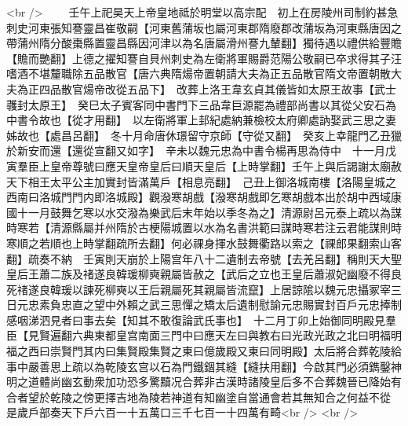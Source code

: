 <br />
　　壬午上祀昊天上帝皇地祗於明堂以高宗配　初上在房陵州司制約甚急刺史河東張知謇靈昌崔敬嗣【河東舊蒲坂也屬河東郡隋廢郡改蒲坂為河東縣唐因之帶蒲州隋分酸棗縣置靈昌縣因河津以為名唐屬滑州謇九輦翻】獨待遇以禮供給豐贍【贍而艷翻】上德之擢知謇自貝州刺史為左衛將軍賜爵范陽公敬嗣已卒求得其子汪嗜酒不堪釐職除五品散官【唐六典隋煬帝置朝請大夫為正五品散官隋文帝置朝散大夫為正四品散官煬帝改從五品下】　改葬上洛王韋玄貞其儀皆如太原王故事【武士彠封太原王】　癸巳太子賓客同中書門下三品韋巨源罷為禮部尚書以其從父安石為中書令故也【從才用翻】　以左衛將軍上邽紀處納兼檢校太府卿處訥娶武三思之妻姊故也【處昌呂翻】　冬十月命唐休璟留守京師【守從又翻】　癸亥上幸龍門乙丑獵於新安而還【還從宣翻又如字】　辛未以魏元忠為中書令楊再思為侍中　十一月戊寅羣臣上皇帝尊號曰應天皇帝皇后曰順天皇后【上時掌翻】壬午上與后謁謝太廟赦天下相王太平公主加實封皆滿萬戶【相息亮翻】　己丑上御洛城南樓【洛陽皇城之西南曰洛城門門内即洛城殿】觀潑寒胡戲【潑寒胡戲即乞寒胡戲本出於胡中西域康國十一月鼓舞乞寒以水交潑為樂武后末年始以季冬為之】清源尉呂元泰上疏以為謀時寒若【清源縣屬并州隋於古梗陽城置以水為名書洪範曰謀時寒若注云君能謀則時寒順之若順也上時掌翻疏所去翻】何必祼身揮水鼓舞衢路以索之【祼郎果翻索山客翻】疏奏不納　壬寅則天崩於上陽宫年八十二遺制去帝號【去羌呂翻】稱則天大聖皇后王蕭二族及禇遂良韓瑗柳奭親屬皆赦之【武后之立也王皇后蕭淑妃幽廢不得良死禇遂良韓瑗以諫死柳奭以王后親屬死其親屬皆流竄】上居諒隂以魏元忠攝冢宰三日元忠素負忠直之望中外賴之武三思憚之矯太后遺制慰諭元忠賜實封百戶元忠捧制感咽涕泗見者曰事去矣【知其不敢復論武氏事也】　十二月丁卯上始御同明殿見羣臣【見賢遍翻六典東都皇宫南面三門中曰應天左曰與教右曰光政光政之北曰明福明福之西曰崇賢門其内曰集賢殿集賢之東曰億歲殿又東曰同明殿】太后將合葬乾陵給事中嚴善思上疏以為乾陵玄宫以石為門鐵錮其縫【縫扶用翻】今啟其門必須鐫鑿神明之道體尚幽玄動衆加功恐多驚黷况合葬非古漢時諸陵皇后多不合葬魏晉已降始有合者望於乾陵之傍更擇吉地為陵若神道有知幽塗自當通會若其無知合之何益不從　是歲戶部奏天下戶六百一十五萬口三千七百一十四萬有畸<br />
<br />
